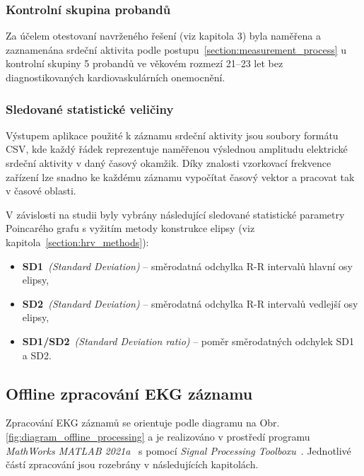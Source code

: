 \subsubsection{Kontrolní skupina probandů}
\label{section:probands}
Za účelem otestovaní navrženého řešení (viz kapitola 3) byla naměřena a
zaznamenána srdeční aktivita podle postupu~\ref{section:measurement_process} u
kontrolní skupiny 5 probandů ve věkovém rozmezí 21--23 let bez diagnostikovaných
kardiovaskulárních onemocnění.

\subsubsection{Sledované statistické veličiny}
\label{section:selected_stats_vals}
Výstupem aplikace použité k záznamu srdeční aktivity jsou soubory formátu CSV,
kde každý řádek reprezentuje naměřenou výslednou amplitudu elektrické srdeční
aktivity v daný časový okamžik. Díky znalosti vzorkovací frekvence zařízení lze
snadno ke každému záznamu vypočítat časový vektor a pracovat tak v časové
oblasti.

V závislosti na studii byly vybrány následující sledované statistické parametry
Poincarého grafu s vyžitím metody konstrukce elipsy (viz
kapitola~\ref{section:hrv_methods}):
\begin{itemize}[noitemsep]
    \item \textbf{SD1}~\textit{(Standard Deviation)} -- směrodatná odchylka R-R
          intervalů hlavní osy elipsy,
    \item \textbf{SD2}~\textit{(Standard Deviation)} -- směrodatná odchylka R-R
          intervalů vedlejší osy elipsy,
    \item \textbf{SD1/SD2}~\textit{(Standard Deviation ratio)} -- poměr směrodatných odchylek SD1 a SD2.
\end{itemize}

\subsection{Offline zpracování EKG záznamu}
\label{section:offline_processing}
Zpracování EKG záznamů se orientuje podle diagramu na Obr.
\ref{fig:diagram_offline_processing} a je realizováno v prostředí programu
\textit{MathWorks MATLAB 2021a}~\cite{MATLAB} s pomocí \textit{Signal Processing
    Toolboxu}~\cite{matlabSPT}. Jednotlivé částí zpracování jsou rozebrány v
následujících kapitolách.

